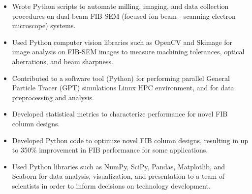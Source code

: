 \documentclass[letterpaper,10.8pt]{article}
\begin{document}
    \begin{itemize}[label={$\diamond$}]
    \itemsep0em %
    
    \item {Wrote Python scripts to automate milling, imaging, and data collection procedures on dual-beam FIB-SEM (focused ion beam - scanning electron microscope) systems.}
	
	\item {Used Python computer vision libraries such as OpenCV and Skimage for image analysis on FIB-SEM images to measure machining tolerances, optical aberrations, and beam sharpness.}
	
	\item {Contributed to a software tool (Python) for performing parallel General Particle Tracer (GPT) simulations Linux HPC environment, and for data preprocessing and analysis.}
	
	\item{Developed statistical metrics to characterize performance for novel FIB column designs.}
	
	\item {Developed Python code to optimize novel FIB column designs, resulting in up to 350\% improvement in FIB performance for some applications.}
	
	\item {Used Python libraries such as NumPy, SciPy, Pandas, Matplotlib, and Seaborn for data analysis, visualization, and presentation to a team of scientists in order to inform decisions on technology development.}
	
	\end{itemize} %
      
\end{document}
